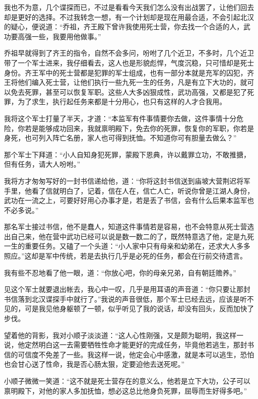 我也不为意，几个谍探而已，不过是看看今天我们怎么没有出战罢了，让他们回去却是更好的选择。不过我转念一想，有一个计划却是现在用最合适，不会引起北汉的疑心，便说道：“乔祖，齐王殿下曾许我使用死士营，你去找一个合适的人，武功要高强一些，我要用他做事。”

乔祖早就得到了齐王的指令，自然不会多问，吩咐了几个近卫，不多时，几个近卫带了一个军士进来，我仔细看去，这人也是形貌彪悍，气度沉稳，只可惜却是死士身份。齐王军中的死士营都是犯罪的军士组成，也有一部分本就是充军的囚犯，齐王将他们编入死士营，让他们执行一些九死一生的任务，凡是有立下大功的，就可以免去死罪，甚至可以恢复军职。这些人大多凶狠成性，武功高强，又都是犯了死罪，为了求生，执行起任务来都是十分用心，也只有这样的人才合我用。

我将这个军士打量了半天，才道：“本监军有件事情要你去做，这件事情十分危险，你若是能够成功回来，我就禀明殿下，免去你的死罪，恢复你的军职，你若是身死，也可列入阵亡名册，家人也可得到抚恤。不知道你可有胆量去做么？”

那个军士下拜道：“小人自知身犯死罪，蒙殿下恩典，许以戴罪立功，不敢推搪，但有任务，请大人吩咐。”

我将方才匆匆写好的一封书信递给他，道：“你将这封书信送到庙坡大营荆迟将军手里，他看了信就明白了，记着，信在人在，信亡人亡，听说你曾是江湖人身份，武功在一流之上，可要好好用心办事才是，若是丢了书信，会有什么后果本监军也不必多说。”

那名军士接过书信，他不是蠢人，知道这件事情若是容易，也不会特意从死士营选出自己来，他在营中武功已经可以说是数一数二的了，既然特意选了他，定是九死一生的重要任务。又磕了一个头道：“小人家中只有母亲和幼弟在，还求大人多多照应。”这却是军中传统，若是去执行几乎是必死的任务，都会在行前交待遗言。

我有些不忍地看了他一眼，道：“你放心吧，你的母亲兄弟，自有朝廷赡养。”

见这个军士就要退出帐去，我心中一叹，几乎是用耳语的声音道：“你只要让那封书信落到北汉谍探手中就行了。”我说的声音很低，那个军士已经去远，应该是听不见的，可是我见他身躯顿了一顿，似乎听见了我的说话，却没有回头，反而加快了步伐。

望着他的背影，我对小顺子淡淡道：“这人心性刚强，又是颇为聪明，我这样一说，他定然明白这一去需要牺牲性命才能更好的完成任务，毕竟他若逃生，那封书信的可信度不免差了一些。我这样一说，他定会心中感激，就是本可以逃生，恐怕也会甘心送了性命，我是否心肠太狠，定要迫他去送死呢。”

小顺子微微一笑道：“这不就是死士营存在的意义么，他若是立下大功，公子可以禀明殿下，对他的家人多加抚恤，想必这总比他身负死罪，屈辱而生好得多吧。”

